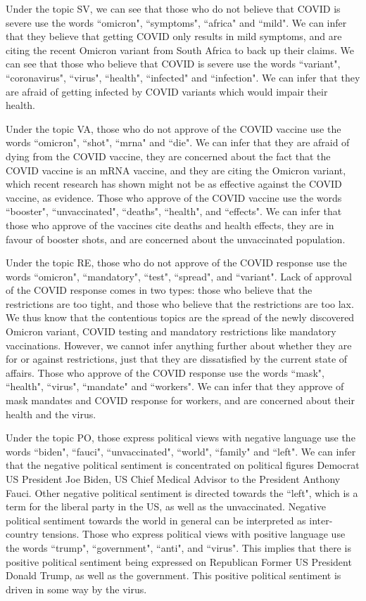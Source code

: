 \documentclass[letterpaper]{article} %
\begin{document}
Under the topic SV, we can see that those who do not believe that COVID is severe use the words ``omicron", ``symptoms", ``africa" and ``mild". We can infer that they believe that getting COVID only results in mild symptoms, and are citing the recent Omicron variant from South Africa to back up their claims. We can see that those who believe that COVID is severe use the words ``variant", ``coronavirus", ``virus", ``health", ``infected" and ``infection". We can infer that they are afraid of getting infected by COVID variants which would impair their health. \par
Under the topic VA, those who do not approve of the COVID vaccine use the words ``omicron", ``shot", ``mrna" and ``die". We can infer that they are afraid of dying from the COVID vaccine, they are concerned about the fact that the COVID vaccine is an mRNA vaccine, and they are citing the Omicron variant, which recent research has shown might not be as effective against the COVID vaccine, as evidence. Those who approve of the COVID vaccine use the words ``booster", ``unvaccinated", ``deaths", ``health", and ``effects". We can infer that those who approve of the vaccines cite deaths and health effects, they are in favour of booster shots, and are concerned about the unvaccinated population. \par
Under the topic RE, those who do not approve of the COVID response use the words ``omicron", ``mandatory", ``test", ``spread", and ``variant". Lack of approval of the COVID response comes in two types: those who believe that the restrictions are too tight, and those who believe that the restrictions are too lax. We thus know that the contentious topics are the spread of the newly discovered Omicron variant, COVID testing and mandatory restrictions like mandatory vaccinations. However, we cannot infer anything further about whether they are for or against restrictions, just that they are dissatisfied by the current state of affairs. Those who approve of the COVID response use the words ``mask", ``health", ``virus", ``mandate" and ``workers". We can infer that they approve of mask mandates and COVID response for workers, and are concerned about their health and the virus.\par
Under the topic PO, those express political views with negative language use the words ``biden", ``fauci", ``unvaccinated", ``world", ``family" and ``left". We can infer that the negative political sentiment is concentrated on political figures Democrat US President Joe Biden, US Chief Medical Advisor to the President Anthony Fauci. Other negative political sentiment is directed towards the ``left", which is a term for the liberal party in the US, as well as the unvaccinated. Negative political sentiment towards the world in general can be interpreted as inter-country tensions. Those who express political views with positive language use the words ``trump", ``government", ``anti", and ``virus". This implies that there is positive political sentiment being expressed on Republican Former US President Donald Trump, as well as the government. This positive political sentiment is driven in some way by the virus. \par
\end{document}
